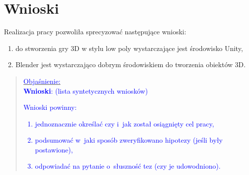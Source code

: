 \chapter{Wnioski}
Realizacja pracy pozwoliła sprecyzować następujące wnioski:
\begin{enumerate}
  \item do stworzenia gry 3D w stylu low poly wystarczające jest środowisko Unity,
  \item Blender jest wystarczająco dobrym środowiskiem do tworzenia obiektów 3D.
\end{enumerate}



\begin{quote}
\scriptsize{
\underline{\textcolor{blue}{Objaśnienie:}}\\[1mm]
\textcolor{blue}{{\textbf{Wnioski}:} (lista syntetycznych wniosków)}\\[1mm]
\textcolor{blue}{
Wnioski powinny:
\begin{enumerate}
\item jednoznacznie określać czy i~jak został osiągnięty cel pracy,
\item podsumować w~jaki sposób zweryfikowano hipotezy (jeśli były postawione),
\item odpowiadać na pytanie o~słuszność tez (czy je udowodniono).
\end{enumerate}
}}
\end{quote} 